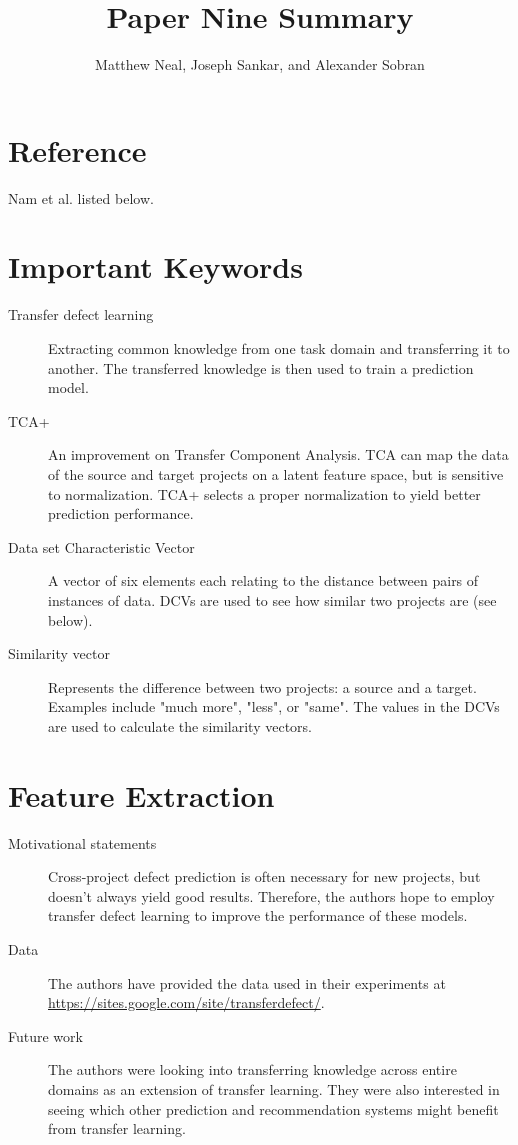 \documentclass[english]{article}
\begin{document}
\title{Paper Nine Summary}


\author{Matthew Neal, Joseph Sankar, and Alexander Sobran}

\maketitle

\section*{Reference}

Nam et al. \cite{Nam} listed below.


\section*{Important Keywords}
\begin{description}
\item[{Transfer defect learning}] Extracting common knowledge from one task domain and transferring it to another. The transferred knowledge is then used to train a prediction model.
\item[{TCA+}] An improvement on Transfer Component Analysis. TCA can map the data of the source and target projects on a latent feature space, but is sensitive to normalization. TCA+ selects a proper normalization to yield better prediction performance.
\item[{Data set Characteristic Vector}] A vector of six elements each relating to the distance between pairs of instances of data. DCVs are used to see how similar two projects are (see below).
\item[{Similarity vector}] Represents the difference between two projects: a source and a target. Examples include "much more", "less", or "same". The values in the DCVs are used to calculate the similarity vectors.
\end{description}

\section*{Feature Extraction}
\begin{description}
\item[{Motivational statements}] Cross-project defect prediction is often necessary for new projects, but doesn't always yield good results. Therefore, the authors hope to employ transfer defect learning to improve the performance of these models.
\item[{Data}] The authors have provided the data used in their experiments at\\
 \href{https://sites.google.com/site/transferdefect/}{https://sites.google.com/site/transferdefect/}.
\item[{Future work}] The authors were looking into transferring knowledge across entire domains as an extension of transfer learning. They were also interested in seeing which other prediction and recommendation systems might benefit from transfer learning.
\end{description}
\end{document}
